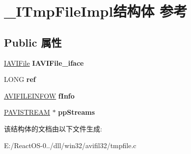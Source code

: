 \hypertarget{struct___i_tmp_file_impl}{}\section{\+\_\+\+I\+Tmp\+File\+Impl结构体 参考}
\label{struct___i_tmp_file_impl}
\subsection*{Public 属性}
\begin{DoxyCompactItemize}
\item 
\mbox{\label{struct___i_tmp_file_impl_a3acce9122466bed57937c9efe6cebb5f}} 
\hyperlink{interface_i_a_v_i_file}{I\+A\+V\+I\+File} {\bfseries I\+A\+V\+I\+File\+\_\+iface}
\item 
\mbox{\label{struct___i_tmp_file_impl_a05bdf739e8ebd064589277102a0f2984}} 
L\+O\+NG {\bfseries ref}
\item 
\mbox{\label{struct___i_tmp_file_impl_a85950da3c4bd8762aa49f9945b457367}} 
\hyperlink{struct___a_v_i_f_i_l_e_i_n_f_o_w}{A\+V\+I\+F\+I\+L\+E\+I\+N\+F\+OW} {\bfseries f\+Info}
\item 
\mbox{\label{struct___i_tmp_file_impl_af61a641862db252e30f6c138abbd3dca}} 
\hyperlink{interface_i_a_v_i_stream}{P\+A\+V\+I\+S\+T\+R\+E\+AM} $\ast$ {\bfseries pp\+Streams}
\end{DoxyCompactItemize}


该结构体的文档由以下文件生成\+:\begin{DoxyCompactItemize}
\item 
E\+:/\+React\+O\+S-\/0../dll/win32/avifil32/tmpfile.\+c\end{DoxyCompactItemize}
